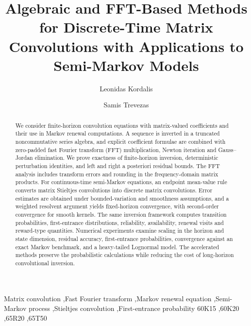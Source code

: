 \documentclass[3p,12pt,authoryear]{elsarticle}
\theoremstyle{definition}
\theoremstyle{remark}
\begin{document}
\begin{frontmatter}

\title{Algebraic and FFT-Based Methods for Discrete-Time Matrix Convolutions with Applications to Semi-Markov Models}

\author[athens]{Leonidas Kordalis }

\author[athens,cs]{Samis Trevezas}
\address[athens]{Department of Mathematics, National and Kapodistrian University of Athens, Athens 15784, Greece}
\address[cs]{MICS Laboratory, CentraleSup\'elec, Universit\'e Paris-Saclay, 91190 Gif-sur-Yvette, France}


\begin{abstract}
We consider finite-horizon convolution equations with matrix-valued coefficients and their use in Markov renewal computations. A sequence is inverted in a truncated noncommutative series algebra, and explicit coefficient formulae are combined with zero-padded fast Fourier transform (FFT) multiplication, Newton iteration and Gauss--Jordan elimination. We prove exactness of finite-horizon inversion, deterministic perturbation identities, and left and right a posteriori residual bounds. The FFT analysis includes transform errors and rounding in the frequency-domain matrix products. For continuous-time semi-Markov equations, an endpoint mean-value rule converts matrix Stieltjes convolutions into discrete matrix convolutions. Error estimates are obtained under bounded-variation and smoothness assumptions, and a weighted resolvent argument yields fixed-horizon convergence, with second-order convergence for smooth kernels. The same inversion framework computes transition probabilities, first-entrance distributions, reliability, availability, renewal visits and reward-type quantities. Numerical experiments examine scaling in the horizon and state dimension, residual accuracy, first-entrance probabilities, convergence against an exact Markov benchmark, and a heavy-tailed Lognormal model. The accelerated methods preserve the probabilistic calculations while reducing the cost of long-horizon convolutional inversion.
\end{abstract}

\begin{keyword}
Matrix convolution \sep Fast Fourier transform \sep Markov renewal equation \sep Semi-Markov process \sep Stieltjes convolution \sep First-entrance probability
\MSC[2020] 60K15 \sep 60K20 \sep 65R20 \sep 65T50
\end{keyword}

\end{frontmatter}
\end{document}

